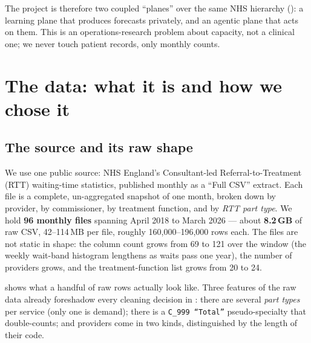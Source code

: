 \documentclass[11pt,a4paper]{article}
\newcommand{\code}[1]{\texttt{\small #1}}
\begin{document}
The project is therefore two coupled ``planes'' over the same NHS hierarchy (): a
learning plane that produces forecasts privately, and an agentic plane that acts on them. This is an
operations-research problem about capacity, not a clinical one; we never touch patient records, only
monthly counts.

\section{The data: what it is and how we chose it}\label{sec:data}

\subsection{The source and its raw shape}
We use one public source: NHS England's Consultant-led Referral-to-Treatment (RTT) waiting-time
statistics, published monthly as a ``Full CSV'' extract. Each file is a complete, un-aggregated
snapshot of one month, broken down by provider, by commissioner, by treatment function, and by
\emph{RTT part type}. We hold \textbf{96 monthly files} spanning April 2018 to March 2026 --- about
\textbf{8.2\,GB} of raw CSV, 42--114\,MB per file, roughly 160{,}000--196{,}000 rows each. The files
are not static in shape: the column count grows from 69 to 121 over the window (the weekly wait-band
histogram lengthens as waits pass one year), the number of providers grows, and the treatment-function
list grows from 20 to 24.

 shows what a handful of raw rows actually look like. Three features of the raw data
already foreshadow every cleaning decision in : there are several \emph{part types} per
service (only one is demand); there is a \code{C\_999 ``Total''} pseudo-specialty that double-counts;
and providers come in two kinds, distinguished by the length of their code.
\end{document}
